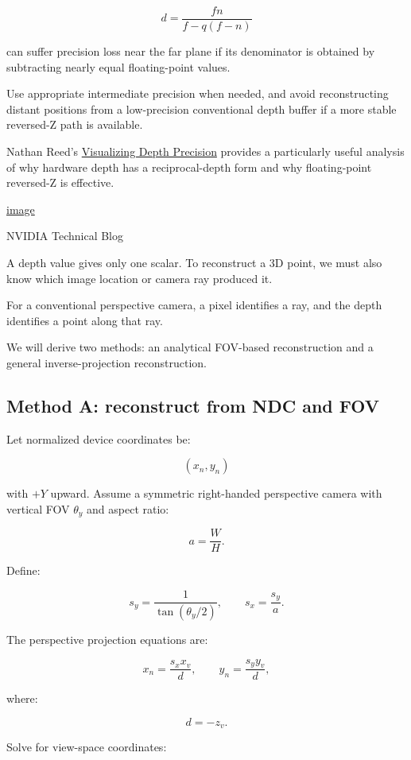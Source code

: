 \[ d=\frac{fn}{f-q(f-n)} \]

can suffer precision loss near the far plane if its denominator is obtained by subtracting nearly equal floating-point values.

Use appropriate intermediate precision when needed, and avoid reconstructing distant positions from a low-precision conventional depth buffer if a more stable reversed-Z path is available.

Nathan Reed's \href{https://developer.nvidia.com/blog/visualizing-depth-precision/?utm_source=chatgpt.com}{Visualizing Depth Precision} provides a particularly useful analysis of why hardware depth has a reciprocal-depth form and why floating-point reversed-Z is effective. 

\href{https://www.google.com/s2/favicons?domain=https://developer.nvidia.com&sz=32}{image}

NVIDIA Technical Blog

A depth value gives only one scalar. To reconstruct a 3D point, we must also know which image location or camera ray produced it.

For a conventional perspective camera, a pixel identifies a ray, and the depth identifies a point along that ray.

We will derive two methods: an analytical FOV-based reconstruction and a general inverse-projection reconstruction.

\subsection{Method A: reconstruct from NDC and FOV}\label{02-foundations-ii-ch035-method-a-reconstruct-from-ndc-and-fov}

Let normalized device coordinates be:

\[ (x_n,y_n) \]

with \(+Y\) upward. Assume a symmetric right-handed perspective camera with vertical FOV \(\theta_y\) and aspect ratio:

\[ a=\frac WH. \]

Define:

\[ s_y=\frac1{\tan(\theta_y/2)}, \qquad s_x=\frac{s_y}{a}. \]

The perspective projection equations are:

\[ x_n=\frac{s_xx_v}{d}, \qquad y_n=\frac{s_yy_v}{d}, \]

where:

\[ d=-z_v. \]

Solve for view-space coordinates:

